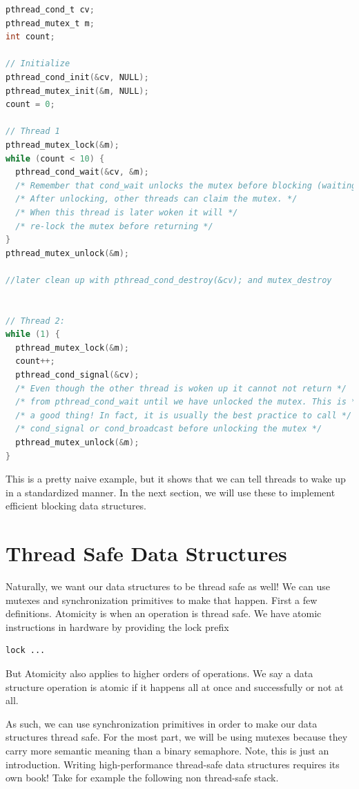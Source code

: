 \begin{lstlisting}[language=C]
pthread_cond_t cv;
pthread_mutex_t m;
int count;

// Initialize
pthread_cond_init(&cv, NULL);
pthread_mutex_init(&m, NULL);
count = 0;

// Thread 1
pthread_mutex_lock(&m);
while (count < 10) {
  pthread_cond_wait(&cv, &m);
  /* Remember that cond_wait unlocks the mutex before blocking (waiting)! */
  /* After unlocking, other threads can claim the mutex. */
  /* When this thread is later woken it will */
  /* re-lock the mutex before returning */
}
pthread_mutex_unlock(&m);

//later clean up with pthread_cond_destroy(&cv); and mutex_destroy


// Thread 2:
while (1) {
  pthread_mutex_lock(&m);
  count++;
  pthread_cond_signal(&cv);
  /* Even though the other thread is woken up it cannot not return */
  /* from pthread_cond_wait until we have unlocked the mutex. This is */
  /* a good thing! In fact, it is usually the best practice to call */
  /* cond_signal or cond_broadcast before unlocking the mutex */
  pthread_mutex_unlock(&m);
}
\end{lstlisting}

This is a pretty naive example, but it shows that we can tell threads to wake up in a standardized manner.
In the next section, we will use these to implement efficient blocking data structures.

\section{Thread Safe Data Structures}

Naturally, we want our data structures to be thread safe as well!
We can use mutexes and synchronization primitives to make that happen.
First a few definitions.
Atomicity is when an operation is thread safe.
We have atomic instructions in hardware by providing the lock prefix
\begin{lstlisting}
lock ...
\end{lstlisting}
But Atomicity also applies to higher orders of operations.
We say a data structure operation is atomic if it happens all at once and successfully or not at all.

As such, we can use synchronization primitives in order to make our data structures thread safe.
For the most part, we will be using mutexes because they carry more semantic meaning than a binary semaphore.
Note, this is just an introduction.
Writing high-performance thread-safe data structures requires its own book!
Take for example the following non thread-safe stack.

